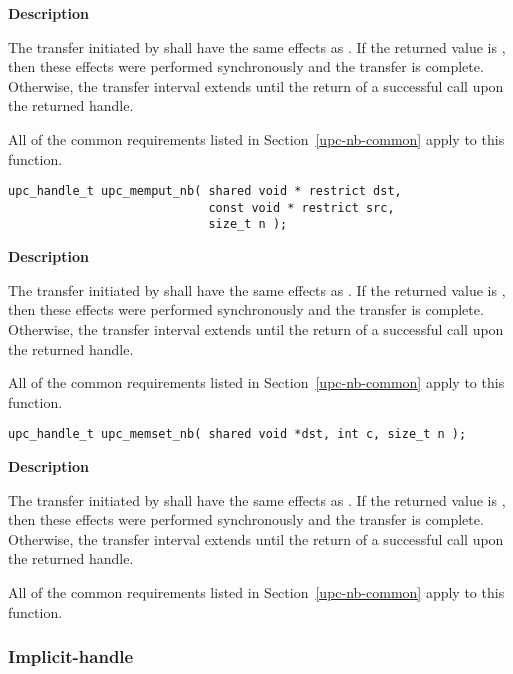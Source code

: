 {\bf Description}

\np The transfer initiated by \func\args shall have the same effects as \sfunc\args.
If the returned value is \complete, then these effects were performed synchronously
and the transfer is complete. Otherwise, the transfer interval extends until
the return of a successful \sync call upon the returned handle.

\np All of the common requirements listed in Section~\ref{upc-nb-common} apply to this function.

\def\bfunc{upc\_memput\_nb}
\def\sfunc{\memput}
\funcheader

\begin{verbatim}
upc_handle_t upc_memput_nb( shared void * restrict dst,
                            const void * restrict src, 
                            size_t n );
\end{verbatim}

{\bf Description}

\np The transfer initiated by \func\args shall have the same effects as \sfunc\args.
If the returned value is \complete, then these effects were performed synchronously
and the transfer is complete. Otherwise, the transfer interval extends until
the return of a successful \sync call upon the returned handle.

\np All of the common requirements listed in Section~\ref{upc-nb-common} apply to this function.

\newpage
\def\bfunc{upc\_memset\_nb}
\def\sfunc{{\memset}}
\funcheader

\begin{verbatim}
upc_handle_t upc_memset_nb( shared void *dst, int c, size_t n );
\end{verbatim}

{\bf Description}

\np The transfer initiated by \func\sargs shall have the same effects as \sfunc\sargs.
If the returned value is \complete, then these effects were performed synchronously
and the transfer is complete. Otherwise, the transfer interval extends until
the return of a successful \sync call upon the returned handle.

\np All of the common requirements listed in Section~\ref{upc-nb-common} apply to this function.

\newpage
\subsubsection{Implicit-handle \TIFs}
\def\bfunc{upc\_memcpy\_nbi}
\def\sfunc{\memcpy}
\funcheader

